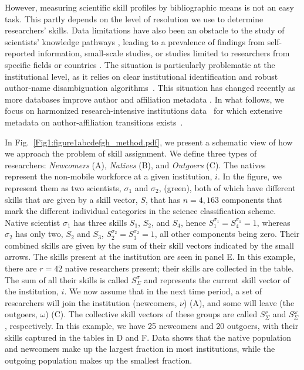 \documentclass[draft,final]{vutinfth} %
\begin{document}
However, measuring scientific skill profiles by bibliographic means is not an easy task. This partly depends on the level of resolution we use to determine researchers' skills. Data limitations have also been an obstacle to the study of scientists' knowledge pathways \cite{robinson2019many,sugimoto2017scientists, machavcek2022researchers}, leading to a prevalence of findings from self-reported information, small-scale studies, or studies limited to researchers from specific fields or countries \cite{jia2017quantifying,aleta2019explore, ganguli2015immigration, stephan2001exceptional, petersen2018multiscale, morgan2018prestige}. The situation is particularly problematic at the institutional level, as it relies on clear institutional identification and robust author-name disambiguation algorithms~\cite{donner2020comparing, machavcek2022researchers}. This situation has changed recently as more databases improve author and affiliation metadata \cite{robinson2019many,sugimoto2017scientists, machavcek2022researchers}. In what follows, we focus on harmonized research-intensive institutions data~\cite{hook2018dimensions,bode2018guide} for which extensive metadata on author-affiliation transitions exists~\cite{machavcek2022researchers}. 

In Fig.~\ref{Fig1:figure1abcdefgh_method.pdf}, we present a schematic view of how we approach the problem of skill assignment. We define three types of researchers: \textit{Newcomers} (A), \textit{Natives} (B), and \textit{Outgoers} (C). The natives represent the non-mobile workforce at a given institution, $i$. In the figure, we represent them as two scientists, $\sigma_1$ and $\sigma_2$, (green), both of which have different skills that are given by a skill vector, $S$, that has $n=4,163$ components that mark the different individual categories in the science classification scheme.  Native scientist $\sigma_1$ has three skills $S_1$, $S_2$, and $S_4$, hence $S^{\sigma_1}_1= S^{\sigma_1}_4= 1$, whereas $\sigma_2$ has only two, $S_2$ and $S_3$, $S^{\sigma_2}_2= S^{\sigma_2}_3= 1$, all other components being zero. Their combined skills are given by the sum of their skill vectors indicated by the small arrows. The skills present at the institution are seen in panel E. In this example, there are $r=42$ native researchers present; their skills are collected in the table. The sum of all their skills is called $S^{\sigma}_{\Sigma}$ and represents the current skill vector of the institution, $i$.  We now assume that in the next time period, a set of researchers will join the institution (newcomers, $\nu$) (A), and some will leave (the outgoers, $\omega$) (C). The collective skill vectors of these groups are called $S^{\nu}_{\Sigma}$ and $S^{\omega}_{\Sigma}$, respectively. In this example, we have 25 newcomers and 20 outgoers, with their skills captured in the tables in D and F. Data shows that the native population and newcomers make up the largest fraction in most institutions, while the outgoing population makes up the smallest fraction.
\end{document}
